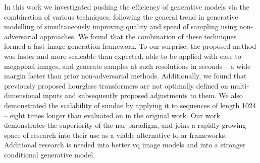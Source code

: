In this work we investigated pushing the efficiency of generative models via the
combination of various techniques, following the general trend in generative
modelling of simultaneously improving quality and speed of sampling using
non-adversarial approaches. We found that the combination of these techniques
formed a fast image generation framework. To our surprise, the proposed method
was faster and more scaleable than expected, able to be applied with ease to
megapixel images, and generate samples at such resolutions in seconds -- a wide
margin faster than prior non-adversarial methods. Additionally, we found that
previously proposed hourglass transformers are not optimally defined on
multi-dimensional inputs and subsequently proposed adjustments to them. We also
demonstrated the scalability of \gls{sundae} by applying it to sequences of
length 1024 -- eight times longer than evaluated on in the original work. Our work
demonstrates the superiority of the \acrlong{nar} paradigm, and joins a rapidly
growing space of research into their use as a viable alternative to \acrlong{ar}
frameworks. Additional research is needed into better \gls{vq} image models and
into a stronger conditional generative model.

